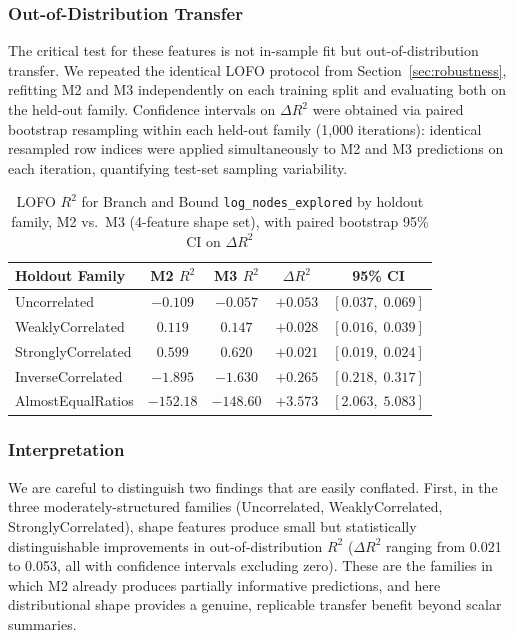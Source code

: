 \documentclass[sigconf]{acmart}
\begin{document}
\subsubsection{Out-of-Distribution Transfer}
The critical test for these features is not in-sample fit but out-of-distribution transfer. We repeated the identical LOFO protocol from Section~\ref{sec:robustness}, refitting M2 and M3 independently on each training split and evaluating both on the held-out family. Confidence intervals on $\Delta R^2$ were obtained via paired bootstrap resampling within each held-out family (1,000 iterations): identical resampled row indices were applied simultaneously to M2 and M3 predictions on each iteration, quantifying test-set sampling variability.

\begin{table}[t]
\centering
\caption{LOFO $R^2$ for Branch and Bound \texttt{log\_nodes\_explored} by holdout family, M2 vs.\ M3 (4-feature shape set), with paired bootstrap 95\% CI on $\Delta R^2$}
\label{tab:lofo_shape}
\begin{tabular}{lcccc}
\toprule
Holdout Family & M2 $R^2$ & M3 $R^2$ & $\Delta R^2$ & 95\% CI \\
\midrule
Uncorrelated       & $-0.109$ & $-0.057$ & $+0.053$ & $[0.037,\;0.069]$ \\
WeaklyCorrelated   & $0.119$  & $0.147$  & $+0.028$ & $[0.016,\;0.039]$ \\
StronglyCorrelated & $0.599$  & $0.620$  & $+0.021$ & $[0.019,\;0.024]$ \\
InverseCorrelated  & $-1.895$ & $-1.630$ & $+0.265$ & $[0.218,\;0.317]$ \\
AlmostEqualRatios  & $-152.18$ & $-148.60$ & $+3.573$ & $[2.063,\;5.083]$ \\
\bottomrule
\end{tabular}
\end{table}

\subsubsection{Interpretation}
We are careful to distinguish two findings that are easily conflated. First, in the three moderately-structured families (Uncorrelated, WeaklyCorrelated, StronglyCorrelated), shape features produce small but statistically distinguishable improvements in out-of-distribution $R^2$ ($\Delta R^2$ ranging from 0.021 to 0.053, all with confidence intervals excluding zero). These are the families in which M2 already produces partially informative predictions, and here distributional shape provides a genuine, replicable transfer benefit beyond scalar summaries.
\end{document}
